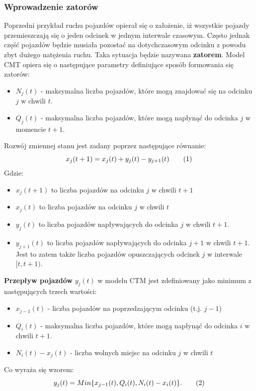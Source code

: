 \documentclass[12pt]{book}
\theoremstyle{plain}
\newcommand\addtag{\refstepcounter{equation}
\renewcommand{\labelenumii}{\theenumii}
\renewcommand{\theenumii}{\theenumi.\arabic{enumii}.}
\tag{\theequation}}
\begin{document}
\subsubsection*{Wprowadzenie zatorów}
Poprzedni przykład ruchu pojazdów opierał się o założenie, iż wszystkie pojazdy przemieszczają się o jeden odcinek w jednym interwale czasowym. Często jednak część pojazdów będzie musiała pozostać na dotychczasowym odcinku z powodu zbyt dużego natężenia ruchu. Taka sytuacja będzie nazywana \textbf{zatorem}. Model CMT opiera się o następujące parametry definiujące sposób formowania się zatorów:
\begin{itemize}
	\item $N_j(t)$ - maksymalna liczba pojazdów, które mogą znajdować się na odcinku $j$ w chwili $t$.
	\item $Q_j(t)$ - maksymalna liczba pojazdów, które mogą napłynąć do odcinka $j$ w momencie $t+1$.
\end{itemize}
Rozwój zmiennej stanu jest zadany poprzez następujące równanie:
\[x_j(t+1)=x_j(t)+y_j(t)-y_{j+1}(t) \addtag \]
Gdzie:
\begin{itemize}
	\item $x_j(t+1)$ to liczba pojazdów na odcinku $j$ w chwili $t+1$
	\item $x_j(t)$ to liczba pojazdów na odcinku $j$ w chwili $t$
	\item $y_j(t)$ to liczba pojazdów napływających do odcinka $j$ w chwili $t+1$.
	\item $y_{j+1}(t)$ to liczba pojazdów napływających do odcinka $j+1$ w chwili $t+1$. Jest to zatem także liczba pojazdów opuszczających odcinek $j$ w interwale $[t,t+1)$.
\end{itemize}
\textbf{Przepływ pojazdów} $y_j(t)$ w modelu CTM jest zdefiniowany jako minimum z następujących trzech wartości:
\begin{itemize}
	\item $ x_{j-1}(t) $ - liczba pojazdów na poprzedzającym odcinku (t.j. $j-1$)
	\item $ Q_i(t) $ - maksymalna liczba pojazdów, które mogą napłynąć do odcinka $i$ w chwili $t+1$.
	\item $ N_i(t)-x_j(t) $ - liczba wolnych miejsc na odcinku $j$ w chwili $t$
\end{itemize}
Co wyraża się wzorem:
\[
y_j(t)=Min\{x_{j-1}(t),Q_i(t),N_i(t)-x_i(t)\}. \addtag \label{eq_y_CTM}
\]
\end{document}

